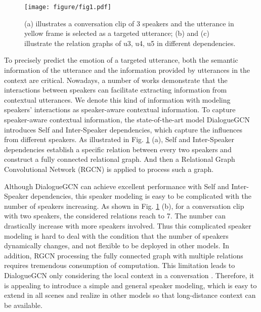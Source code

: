 \documentclass[letterpaper]{article} \usepackage{aaai21}  \usepackage{times}  \usepackage{helvet} \usepackage{courier}  \usepackage[hyphens]{url}  \usepackage{graphicx} \urlstyle{rm} \def\UrlFont{\rm}  \usepackage{natbib}  \usepackage{caption} \usepackage{multirow}
\begin{document}
\begin{figure}
\centering
  \texttt{[image: figure/fig1.pdf]}
\caption{(a) illustrates a conversation clip of 3 speakers and the utterance in yellow frame is selected as a targeted utterance; (b) and (c) illustrate the relation graphs of u3, u4, u5 in different dependencies. }
\label{fig: eg}
\end{figure}







To precisely predict the emotion of a targeted utterance, both the semantic information of the utterance and the information provided by utterances in the context are critical. Nowadays, a number of works \citep{ICON,CMN,DialogueRNN,DialogueGCN} demonstrate that the interactions between speakers can facilitate extracting information from contextual utterances. We denote this kind of information with modeling speakers' interactions as speaker-aware contextual information. To capture speaker-aware contextual information, the state-of-the-art model DialogueGCN \citep{DialogueGCN} introduces Self and Inter-Speaker dependencies, which capture the influences from different speakers. As illustrated in Fig. \ref{fig: eg} (a), Self and Inter-Speaker dependencies establish a specific relation between every two speakers and construct a fully connected relational graph. And then a Relational Graph Convolutional Network (RGCN) \citep{RGCN} is applied to process such a graph. 

Although DialogueGCN can achieve excellent performance with Self and Inter-Speaker dependencies, this speaker modeling is easy to be complicated with the number of speakers increasing. As shown in Fig. \ref{fig: eg} (b), for a conversation clip with two speakers, the considered relations reach to 7. The number can drastically increase with more speakers involved. Thus this complicated speaker modeling is hard to deal with the condition that the number of speakers dynamically changes, and not flexible to be deployed in other models. In addition, RGCN processing the fully connected graph with multiple relations requires tremendous consumption of computation. This limitation leads to DialogueGCN only considering the local context in a conversation \citep{DialogueGCN}. Therefore, it is appealing to introduce a simple and general speaker modeling, which is easy to extend in all scenes and realize in other models so that long-distance context can be available. 
\end{document}
